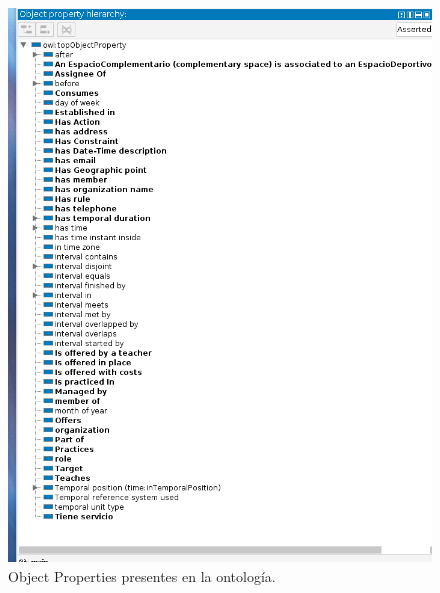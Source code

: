 \documentclass[a4paper,12pt]{article}
\begin{document}
	\begin{figure}[H]
		\centering
		\includegraphics[width=\textwidth]{include/object.png}
		\caption{Object Properties presentes en la ontología.}
	\end{figure}
\end{document}
